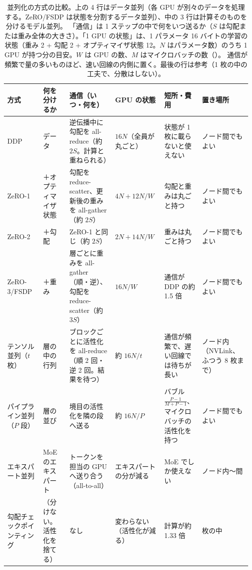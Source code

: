 \begin{table}[tbp]
\centering
\caption{並列化の方式の比較。上の 4 行はデータ並列（各 GPU が別々のデータを処理する。ZeRO/FSDP は状態を分割するデータ並列）、中の 3 行は計算そのものを分けるモデル並列。
「通信」は 1 ステップの中で何をいつ送るか（$S$ は勾配または重み全体の大きさ）。「1 GPU の状態」は、1 パラメータ 16 バイトの学習の状態（重み 2 + 勾配 2 + オプティマイザ状態 12。$N$ はパラメータ数）のうち 1 GPU が持つ分の目安。$W$ は GPU の数、$M$ はマイクロバッチの数（）。
通信が頻繁で量の多いものほど、速い回線の内側に置く。最後の行は参考（1 枚の中の工夫で、分散はしない）。}
\label{tab:dist-compare}
\footnotesize
\setlength{\tabcolsep}{3pt}
\begin{tabular}{>{\raggedright\arraybackslash}p{16mm}>{\raggedright\arraybackslash}p{16mm}>{\raggedright\arraybackslash}p{29mm}>{\raggedright\arraybackslash}p{16mm}>{\raggedright\arraybackslash}p{23mm}>{\raggedright\arraybackslash}p{16mm}}
\toprule
方式 & 何を分けるか & 通信（いつ・何を） & 1 GPU の状態 & 短所・費用 & 置き場所 \\
\midrule
DDP & データ & 逆伝播中に勾配を all-reduce（約 $2S$。計算と重ねられる） & $16N$（全員が丸ごと） & 状態が 1 枚に載らないと使えない & ノード間でもよい \\
ZeRO-1 & ＋オプティマイザ状態 & 勾配を reduce-scatter、更新後の重みを all-gather（約 $2S$） & $4N+12N/W$ & 勾配と重みは丸ごと持つ & ノード間でもよい \\
ZeRO-2 & ＋勾配 & ZeRO-1 と同じ（約 $2S$） & $2N+14N/W$ & 重みは丸ごと持つ & ノード間でもよい \\
ZeRO-3/\allowbreak FSDP & ＋重み & 層ごとに重みを all-gather（順・逆）、勾配を reduce-scatter（約 $3S$） & $16N/W$ & 通信が DDP の約 1.5 倍 & ノード間でもよい \\
\midrule
テンソル並列（$t$ 枚） & 層の中の行列 & 1 ブロックごとに活性化を all-reduce（順 2 回・逆 2 回。結果を待つ） & 約 $16N/t$ & 通信が頻繁で、遅い回線では待ちが長い & ノード内（NVLink、ふつう 8 枚まで） \\
パイプライン並列（$P$ 段） & 層の並び & 境目の活性化を隣の段へ送る & 約 $16N/P$ & バブル $\frac{P-1}{M+P-1}$、マイクロバッチの活性化を持つ & ノード間でもよい \\
エキスパート並列 & MoE のエキスパート & トークンを担当の GPU へ送り合う（all-to-all） & エキスパートの分が減る & MoE でしか使えない & ノード内〜間 \\
\midrule
勾配チェックポインティング & （分けない。活性化を捨てる） & なし & 変わらない（活性化が減る） & 計算が約 1.33 倍 & 1 枚の中 \\
\bottomrule
\end{tabular}
\end{table}


